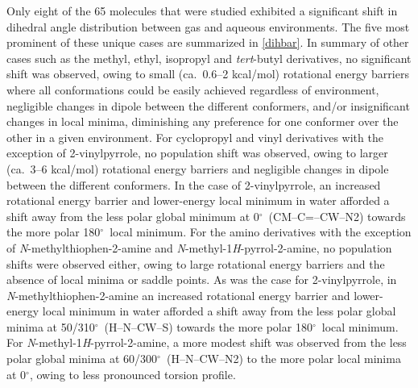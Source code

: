 \documentclass[12pt]{report}
\def\deg{$^{\circ}$}
\begin{document}
Only eight of the 65 molecules that were studied exhibited a significant shift in dihedral angle distribution between gas and aqueous environments. The five most prominent of these unique cases are summarized in \cref{dihbar}. In summary of other cases such as the methyl, ethyl, isopropyl and \textit{tert}-butyl derivatives, no significant shift was observed, owing to small (ca.\ 0.6--2 kcal/mol) rotational energy barriers where all conformations could be easily achieved regardless of environment, negligible changes in dipole between the different conformers, and/or insignificant changes in local minima, diminishing any preference for one conformer over the other in a given environment. For cyclopropyl and vinyl derivatives with the exception of 2-vinylpyrrole, no population shift was observed, owing to larger (ca.\ 3--6 kcal/mol) rotational energy barriers and negligible changes in dipole between the different conformers. In the case of 2-vinylpyrrole, an increased rotational energy barrier and lower-energy local minimum in water afforded a shift away from the less polar global minimum at 0\deg\ (CM--C=--CW--N2) towards the more polar 180\deg\ local minimum. For the amino derivatives with the exception of \textit{N}-methylthiophen-2-amine and \textit{N}-methyl-1\textit{H}-pyrrol-2-amine, no population shifts were observed either, owing to large rotational energy barriers and the absence of local minima or saddle points. As was the case for 2-vinylpyrrole, in \textit{N}-methylthiophen-2-amine an increased rotational energy barrier and lower-energy local minimum in water afforded a shift away from the less polar global minima at 50/310\deg\ (H--N--CW--S) towards the more polar 180\deg\ local minimum. For \textit{N}-methyl-1\textit{H}-pyrrol-2-amine, a more modest shift was observed from the less polar global minima at 60/300\deg\ (H--N--CW--N2) to the more polar local minima at 0\deg, owing to less pronounced torsion profile.
\end{document}
